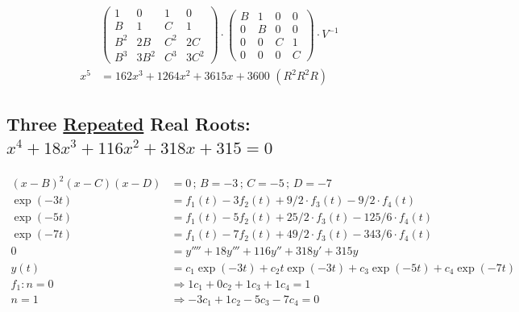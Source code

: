 \documentclass[12pt,a4paper]{article}
\begin{document}
\begin{align}
&\left( \begin{matrix}  1 & 0 & 1 & 0 \\ B & 1 & C & 1 \\ B^2 & 2B & C^2 & 2C \\ B^3 & 3B^2 & C^3 & 3C^2  \end{matrix} \right) \cdot
\left( \begin{matrix}  B & 1 & 0 & 0 \\ 0 & B & 0 & 0 \\ 0 & 0 & C & 1 \\ 0 & 0 & 0 & C  \end{matrix} \right) \cdot V^{-1} \\
x^5 &= 162 x^3 + 1264 x^2 + 3615 x + 3600\,\,(R^2R^2R)
\end{align}

\subsection{Three \href{}{Repeated} Real Roots: $x^4 + 18 x^3 + 116 x^2 + 318 x + 315 = 0$}

\begin{align}
(x - B)^2 (x - C)(x - D) &= 0\,;\,B = -3\,;\,C = -5\,;\,D = -7 \\
\exp (-3t) &= f_1(t) - 3 f_2(t) + 9/2\cdot f_3(t) - 9/2\cdot f_4(t) \\
\exp (-5t) &= f_1(t) - 5 f_2(t) + 25/2\cdot f_3(t) - 125/6\cdot f_4(t) \\
\exp (-7t) &= f_1(t) - 7 f_2(t) + 49/2\cdot f_3(t) - 343/6\cdot f_4(t) \\
0 &= y'''' + 18 y''' + 116 y'' + 318 y' + 315 y \\
y(t) &= c_1 \exp(-3t) + c_2 t \exp(-3t) + c_3 \exp(-5t) + c_4 \exp (-7t) \\
f_1: n = 0 &\Rightarrow 1 c_1 + 0 c_2 + 1 c_3 + 1 c_4 = 1 \\
n = 1 &\Rightarrow -3 c_1 + 1 c_2 - 5 c_3 - 7 c_4 = 0
\end{align}
\end{document}
